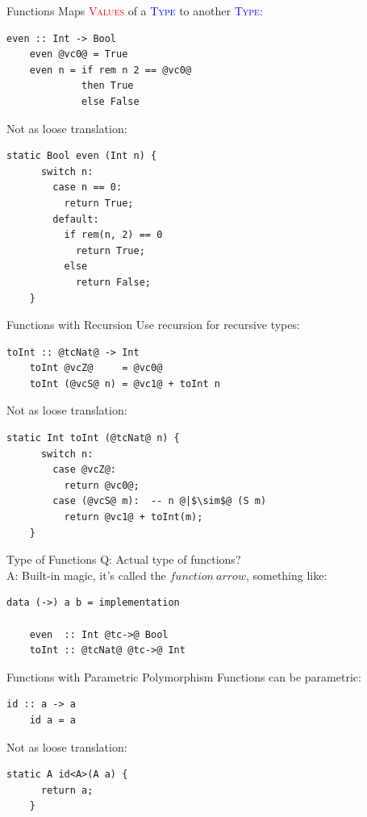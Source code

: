\documentclass[xcolor={usenames,dvipsnames}]{beamer}
\newcommand{\htycon}[1]{\textcolor{Blue}{\textsc{#1}}}
\newcommand{\hvalcon}[1]{\textcolor{Red}{\textsc{#1}}}
\begin{document}
\begin{frame}[fragile]{Functions}
  Maps \hvalcon{Values} of a \htycon{Type} to another \htycon{Type}:
  \begin{lstlisting}[style=hask]
    even :: Int -> Bool
    even @vc0@ = True
    even n = if rem n 2 == @vc0@
             then True
             else False
  \end{lstlisting}

  \pause
  Not as loose translation:
  \begin{lstlisting}[style=hask]
    static Bool even (Int n) {
      switch n:
        case n == 0:
          return True;
        default:
          if rem(n, 2) == 0
            return True;
          else
            return False;
    }
  \end{lstlisting}
\end{frame}

\begin{frame}[fragile]{Functions with Recursion}
  Use recursion for recursive types:
  \begin{lstlisting}[style=hask]
    toInt :: @tcNat@ -> Int
    toInt @vcZ@     = @vc0@
    toInt (@vcS@ n) = @vc1@ + toInt n
  \end{lstlisting}

  \pause
  Not as loose translation:
  \begin{lstlisting}[style=hask]
    static Int toInt (@tcNat@ n) {
      switch n:
        case @vcZ@:
          return @vc0@;
        case (@vcS@ m):  -- n @|$\sim$@ (S m)
          return @vc1@ + toInt(m);
    }
  \end{lstlisting}
\end{frame}

\begin{frame}[fragile]{Type of Functions}
  Q: Actual type of functions?\\
  \pause
  A: Built-in magic, it's called the $function\ arrow$, something like:
  \begin{lstlisting}[style=hask]
    data (->) a b = implementation

    even  :: Int @tc->@ Bool
    toInt :: @tcNat@ @tc->@ Int
  \end{lstlisting}
\end{frame}

\begin{frame}[fragile]{Functions with Parametric Polymorphism}
  Functions can be parametric:
  \begin{lstlisting}[style=hask]
    id :: a -> a
    id a = a
  \end{lstlisting}

  \pause
  Not as loose translation:
  \begin{lstlisting}[style=hask]
    static A id<A>(A a) {
      return a;
    }
  \end{lstlisting}
\end{frame}
\end{document}
